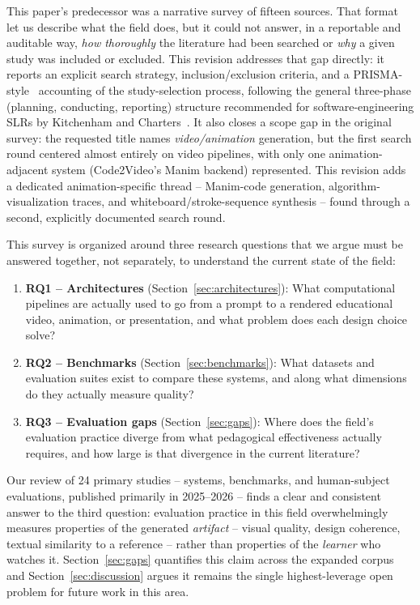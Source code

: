 \documentclass[journal]{IEEEtran}
\begin{document}
This paper's predecessor was a narrative survey of fifteen sources. That format let us describe what the field does, but it could not answer, in a reportable and auditable way, \emph{how thoroughly} the literature had been searched or \emph{why} a given study was included or excluded. This revision addresses that gap directly: it reports an explicit search strategy, inclusion/exclusion criteria, and a PRISMA-style~\cite{page2021prisma} accounting of the study-selection process, following the general three-phase (planning, conducting, reporting) structure recommended for software-engineering SLRs by Kitchenham and Charters~\cite{kitchenham2007guidelines}. It also closes a scope gap in the original survey: the requested title names \emph{video/animation} generation, but the first search round centered almost entirely on video pipelines, with only one animation-adjacent system (Code2Video's Manim backend) represented. This revision adds a dedicated animation-specific thread -- Manim-code generation, algorithm-visualization traces, and whiteboard/stroke-sequence synthesis -- found through a second, explicitly documented search round.

This survey is organized around three research questions that we argue must be answered together, not separately, to understand the current state of the field:

\begin{enumerate}
\item \textbf{RQ1 -- Architectures} (Section~\ref{sec:architectures}): What computational pipelines are actually used to go from a prompt to a rendered educational video, animation, or presentation, and what problem does each design choice solve?
\item \textbf{RQ2 -- Benchmarks} (Section~\ref{sec:benchmarks}): What datasets and evaluation suites exist to compare these systems, and along what dimensions do they actually measure quality?
\item \textbf{RQ3 -- Evaluation gaps} (Section~\ref{sec:gaps}): Where does the field's evaluation practice diverge from what pedagogical effectiveness actually requires, and how large is that divergence in the current literature?
\end{enumerate}

Our review of 24 primary studies -- systems, benchmarks, and human-subject evaluations, published primarily in 2025--2026 -- finds a clear and consistent answer to the third question: evaluation practice in this field overwhelmingly measures properties of the generated \emph{artifact} -- visual quality, design coherence, textual similarity to a reference -- rather than properties of the \emph{learner} who watches it. Section~\ref{sec:gaps} quantifies this claim across the expanded corpus and Section~\ref{sec:discussion} argues it remains the single highest-leverage open problem for future work in this area.
\end{document}

